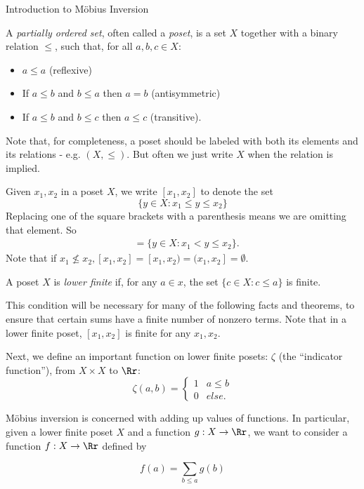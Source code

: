 \documentclass[12pt]{pom_thesis}
\begin{document}
\begin{chapter}{Introduction to M\"obius Inversion}
\begin{defn}
A \emph{partially ordered set}, often called a \emph{poset}, is a set $X$ together with a binary relation $\leq$, such that, for all $a,b,c \in X$:
\begin{itemize}
\item $a \leq a$ (reflexive)
\item If $a \leq b$ and $b \leq a$ then $a = b$ (antisymmetric)
\item If $a \leq b$ and $b \leq c$ then $a \leq c$ (transitive).
\end{itemize}
\end{defn}
Note that, for completeness, a poset should be labeled with both its elements and its relations - e.g. $(X, \leq)$. But often we just write $X$ when the relation is implied.
\begin{rmk}
Given $x_1, x_2$ in a poset $X$, we write $[x_1, x_2]$ to denote the set 
\[
\{y \in X: x_1 \leq y \leq x_2\}
\]
Replacing one of the square brackets with a parenthesis means we are omitting that element. So
\begin{align*}
[x_1, x_2) &= \{y \in X: x_1 \leq y < x_2\},\\
(x_1, x_2] &= \{y \in X: x_1 < y \leq x_2\}.
\end{align*}
Note that if $x_1 \nleq x_2, [x_1, x_2] = [x_1, x_2) = (x_1, x_2]= \emptyset.$
\end{rmk}
\begin{defn}
A poset $X$ is \emph{lower finite} if, for any $a \in x$, the set $\{ c \in X: c \leq a\}$ is finite.
\end{defn}
This condition will be necessary for many of the following facts and theorems, to ensure that certain sums have a finite number of nonzero terms. Note that in a lower finite poset, $[x_1, x_2]$ is finite for any $x_1, x_2$.

Next, we define an important function on lower finite posets: $\zeta$ (the ``indicator function''), from $X \times X$ to $\Rr$:
\[
\zeta(a,b) = \begin{cases} 1 & a \leq b \\ 0 & else. \end{cases}
\]

M\"obius inversion is concerned with adding up values of functions. In particular, given a lower finite poset $X$ and a function $g:X \rightarrow \Rr$, we want to consider a function $f:X \rightarrow \Rr$ defined by

\[
f(a) = \sum_{b \leq a}g(b)
\]


\end{chapter}
\end{document}
